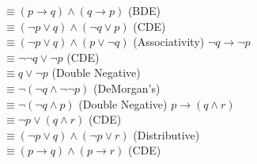 \documentclass{article}
\begin{document}
\begin{outline}[enumerate]
            $\equiv (p \rightarrow q) \wedge (q \rightarrow p)$ (BDE) \\
            $\equiv (\neg p \vee q) \wedge (\neg q \vee p)$ (CDE) \\
            $\equiv (\neg p \vee q) \wedge (p \vee \neg q)$ (Associativity)
        \2 
            $\neg q \rightarrow \neg p$ \\
            $\equiv \neg \neg q \vee \neg p$ (CDE) \\
            $\equiv q \vee \neg p$ (Double Negative) \\
            $\equiv \neg(\neg q \wedge \neg \neg p)$ (DeMorgan's) \\
            $\equiv \neg(\neg q \wedge p)$ (Double Negative)
        \2  
            $p \rightarrow (q \wedge r)$ \\
            $\equiv \neg p \vee (q \wedge r)$ (CDE)\\
            $\equiv (\neg p \vee q) \wedge (\neg p \vee r)$ (Distributive)\\
            $\equiv (p \rightarrow q) \wedge (p \rightarrow r)$ (CDE)


    

\end{outline}
\end{document}
